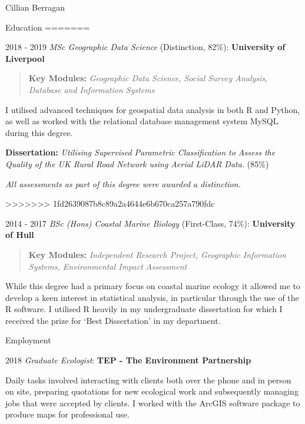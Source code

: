 \documentclass{scrartcl}
\begin{document}
\begin{cv}{Cillian Berragan}
\begin{cvlist}{Education}
=======
\item[2018 - 2019] \normalsize\textit{MSc Geographic Data Science} (Distinction, 82\%): \textbf{University of Liverpool}

    \begin{quote}
        \small\textbf{Key Modules: }\textit{Geographic Data Science, Social Survey Analysis, Database and Information Systems}
    \end{quote}

    \small I utilised advanced techniques for geospatial data analysis in both R and Python, as well as worked with the relational database management system MySQL during this degree.

        \textbf{Dissertation:} \textit{Utilising Supervised Parametric Classification to Assess the Quality of the UK Rural Road Network using Aerial LiDAR Data.} (85\%)

    \textit{All assessments as part of this degree were awarded a distinction.}

>>>>>>> 1fd2639087b8c89a2a4644e6b670ca257a790fdc
    \item[2014 - 2017] \normalsize\textit{BSc (Hons) Coastal Marine Biology} (First-Class, 74\%): \textbf{University of Hull}

    \begin{quote}
        \small \textbf{Key Modules:} \textit{Independent Research Project, Geographic Information Systems, Environmental Impact Assessment}
    \end{quote}

    \small While this degree had a primary focus on coastal marine ecology it allowed me to develop a keen interest in statistical analysis, in particular through the use of the R software. I utilised R heavily in my undergraduate dissertation for which I received the prize for ‘Best Dissertation’ in my department.

\end{cvlist}

\begin{cvlist}{Employment}

    \item[2018] \normalsize\textit{Graduate Ecologist}: \textbf{TEP - The Environment Partnership}

    \small Daily tasks involved interacting with clients both over the phone and in person on site, preparing quotations for new ecological work and subsequently managing jobs that were accepted by clients. I worked with the ArcGIS software package to produce maps for professional use.


\end{cvlist}
\end{cv}
\end{document}
